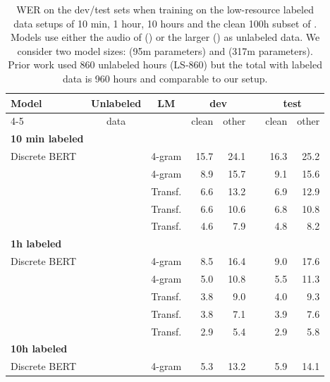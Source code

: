\documentclass{article}
\begin{document}
\begin{table}[t]
\caption{WER on the \libri{} dev/test sets when training on the \libril{} low-resource labeled data setups of 10 min, 1 hour, 10 hours and the clean 100h subset of \libri{}. 
Models use either the audio of \libri{} (\librisz{}) or the larger \vox{} (\voxsz{}) as unlabeled data.
We consider two model sizes: \wvppbase{} (95m parameters) and \wvppbig{} (317m parameters).
Prior work used 860 unlabeled hours (LS-860) but the total with labeled data is 960 hours and comparable to our setup.
}
\label{tab:librilight}
\centering 
\begin{tabular}{lccrrrrr}
\toprule
\multirow{2}{*}{Model} & Unlabeled & \multirow{2}{*}{LM} & \multicolumn{2}{c}{dev} && \multicolumn{2}{c}{test} \\
\cline{4-5}\cline{7-8} 
{} & data & {} & clean & other && clean & other \\
\midrule
\midrule
\multicolumn{8}{l}{\textbf{10 min labeled}}\\
Discrete BERT~\citep{baevski2019effectiveness} & \librisz{} & 4-gram & 15.7 & 24.1 && 16.3 & 25.2 \\
\midrule
\wvppbase{} & \librisz{} & 4-gram & 8.9 & 15.7 && 9.1 & 15.6 \\
&& Transf. & 6.6 & 13.2 && 6.9 & 12.9 \\
\wvppbig{} & \librisz{} & Transf. & 6.6 & 10.6 && 6.8 & 10.8 \\
& \voxsz{} & Transf. & 4.6 & 7.9 && 4.8 & 8.2 \\
\midrule
\midrule
\multicolumn{8}{l}{\textbf{1h labeled}}\\
Discrete BERT~\citep{baevski2019effectiveness} & \librisz{} & 4-gram & 8.5 & 16.4 && 9.0 & 17.6 \\
\midrule
\wvppbase{} & \librisz{} & 4-gram & 5.0 & 10.8 && 5.5 & 11.3 \\
&& Transf. & 3.8 & 9.0 && 4.0 & 9.3 \\
\wvppbig{} & \librisz{} & Transf. & 3.8 & 7.1 && 3.9 & 7.6 \\
& \voxsz{} & Transf. & 2.9 & 5.4 && 2.9 & 5.8 \\
\midrule
\midrule
\multicolumn{8}{l}{\textbf{10h labeled}}\\
Discrete BERT~\citep{baevski2019effectiveness} & \librisz{} & 4-gram & 5.3 & 13.2 && 5.9 & 14.1 \\

\end{tabular}
\end{table}
\end{document}
